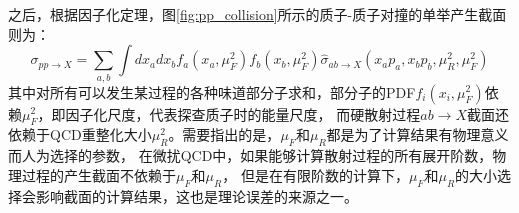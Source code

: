 之后，根据因子化定理\cite{Collins:1989gx}，图\ref{fig:pp_collision}所示的质子-质子对撞的单举产生截面则为：
\begin{equation}
 \sigma_{pp\rightarrow X}=\sum_{a,b}\int dx_adx_bf_a(x_a,\mu_F^2)f_b(x_b,\mu_F^2)\hat{\sigma}_{ab\rightarrow X}(x_ap_a,x_bp_b,\mu_R^2,\mu_F^2)
\end{equation}
其中对所有可以发生某过程的各种味道部分子求和，部分子的PDF$f_i(x_i,\mu_F^2)$依赖$\mu_F^2$，即因子化尺度，代表探查质子时的能量尺度，
而硬散射过程$ab\rightarrow X$截面还依赖于QCD重整化大小$\mu_R^2$。需要指出的是，$\mu_F$和$\mu_R$都是为了计算结果有物理意义而人为选择的参数，
在微扰QCD中，如果能够计算散射过程的所有展开阶数，物理过程的产生截面不依赖于$\mu_F$和$\mu_R$，
但是在有限阶数的计算下，$\mu_F$和$\mu_R$的大小选择会影响截面的计算结果，这也是理论误差的来源之一。